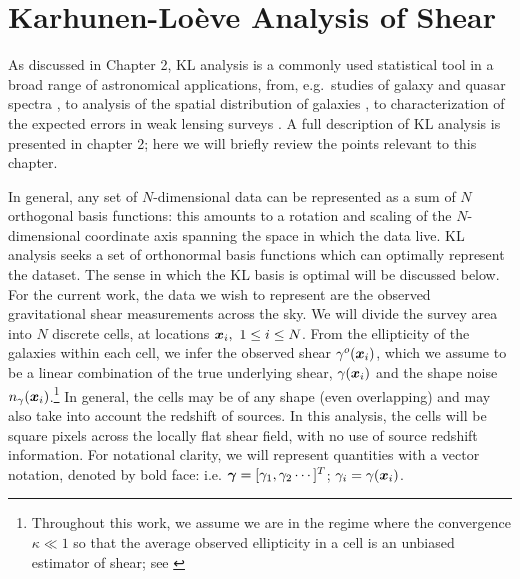 \section{Karhunen-Lo\`{e}ve Analysis of Shear}
\label{KL_Intro}
As discussed in Chapter 2, KL analysis is a commonly used statistical tool
in a broad range of astronomical applications, from, e.g.~studies of 
galaxy and quasar spectra \citep{Connolly95,Connolly99,Yip04a,Yip04b}, to 
analysis of the spatial distribution of galaxies 
\citep{Vogeley96,Matsubara00,Pope04}, to characterization of the 
expected errors in weak lensing surveys \citep{Kilbinger06, Munshi06}.
A full description of KL analysis is presented in chapter 2; here we
will briefly review the points relevant to this chapter.

In general, any set of $N$-dimensional data can be represented as a sum of 
$N$ orthogonal basis functions: this amounts to a rotation and scaling of 
the $N$-dimensional coordinate axis spanning the space in which the data live.
KL analysis seeks a set of orthonormal basis functions which can optimally
represent the dataset.  The sense in which the KL basis is optimal will be
discussed below.  For the current work, the data we wish to represent are the 
observed gravitational shear measurements across the sky.  
We will divide the survey 
area into $N$ discrete cells, at locations $\myvec{x}_i,\ 1\le i \le N$.  
From the ellipticity of the galaxies within each cell, 
we infer the observed shear $\gamma^o(\boldsymbol{x}_i)$, which we assume
to be a linear combination of the true underlying shear, $\gamma(\boldsymbol{x}_i)$
and the shape noise $n_\gamma(\boldsymbol{x}_i)$.\footnote{
Throughout this work, we assume we are in the regime where the convergence
$\kappa \ll 1$ so that the average observed ellipticity in a 
cell is an unbiased estimator of shear; see \citet{Bartelmann01}}
In general, the cells may be of any shape (even overlapping) 
and may also take into account the redshift of sources.
In this analysis, the cells will be square pixels across the locally 
flat shear field, with no use of source redshift information.  
For notational clarity, we will represent quantities with a vector notation,
denoted by bold face: i.e. $\boldsymbol{\gamma} = [\gamma_1,\gamma_2\cdots]^T$; 
$\gamma_i = \gamma(\boldsymbol{x}_i)$. 

